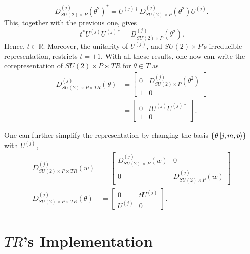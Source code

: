 \documentclass[12pt]{revtex4-2}
\begin{document}
\begin{equation}
    D^{(j)}_{SU(2)\times P}(\theta^{2})^\ast = U^{(j)\dagger}D^{(j)}_{SU(2)\times P}(\theta^{2})U^{(j)}.
\end{equation}
This, together with the previous one, gives
\begin{equation}
    t^\ast U^{(j)}U^{(j)\ast} = D^{(j)}_{SU(2)\times P}(\theta^{2}).
\end{equation}
Hence, $t\in\mathbb{R}$. Moreover, the unitarity of $U^{(j)}$, and $SU(2)\times P$'s irreducible representation, restricts $t = \pm 1$. With all these results, one now can write the corepresentation of $SU(2)\times P\times TR$ for $\theta\in T$ as
\begin{equation}
    \begin{aligned}
        D_{SU(2)\times P\times TR}^{(j)}(\theta) &= 
        \begin{bmatrix}
            0 & D^{(j)}_{SU(2)\times P}(\theta^2) \\
            1 & 0
        \end{bmatrix} \\
        &= \begin{bmatrix}
            0 & t U^{(j)}U^{(j)\ast} \\
            1 & 0
        \end{bmatrix}.
    \end{aligned}
\end{equation}

One can further simplify the representation by changing the basis $\{\theta\ket{j, m, p}\}$ with $U^{(j)}$,
\begin{equation}
    \begin{aligned}
        D_{SU(2)\times P\times TR}^{(j)}(w) &= 
        \begin{bmatrix}
            D^{(j)}_{SU(2)\times P}(w) & 0 \\
            0 & D^{(j)}_{SU(2)\times P}(w)
        \end{bmatrix} \\
        D_{SU(2)\times P\times TR}^{(j)}(\theta) &= 
        \begin{bmatrix}
            0 & t U^{(j)} \\
            U^{(j)} & 0
        \end{bmatrix}.
    \end{aligned}
\end{equation}

\section{$TR$'s Implementation}
\end{document}
